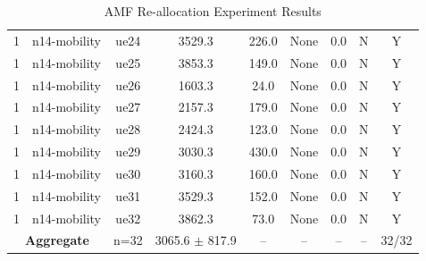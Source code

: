 \begin{table}[ht]
\begin{tabular}{|c|c|c|c|c|c|c|c|c|}
1 & n14-mobility & ue24 & 3529.3 & 226.0 & None & 0.0 & N & Y \\
1 & n14-mobility & ue25 & 3853.3 & 149.0 & None & 0.0 & N & Y \\
1 & n14-mobility & ue26 & 1603.3 & 24.0 & None & 0.0 & N & Y \\
1 & n14-mobility & ue27 & 2157.3 & 179.0 & None & 0.0 & N & Y \\
1 & n14-mobility & ue28 & 2424.3 & 123.0 & None & 0.0 & N & Y \\
1 & n14-mobility & ue29 & 3030.3 & 430.0 & None & 0.0 & N & Y \\
1 & n14-mobility & ue30 & 3160.3 & 160.0 & None & 0.0 & N & Y \\
1 & n14-mobility & ue31 & 3529.3 & 152.0 & None & 0.0 & N & Y \\
1 & n14-mobility & ue32 & 3862.3 & 73.0 & None & 0.0 & N & Y \\
\multicolumn{2}{|c|}{\textbf{Aggregate}} & n=32 & 3065.6 $\pm$ 817.9 & -- & -- & -- & -- & 32/32 \\
\hline
\end{tabular}
\caption{AMF Re-allocation Experiment Results}
\label{tab:amf_realloc}
\end{table}
